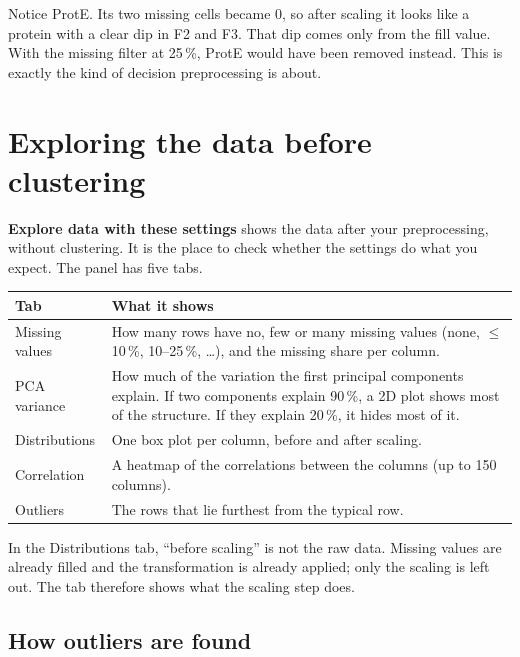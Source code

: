 \documentclass[11pt,a4paper]{article}
\newcommand{\ui}[1]{\textsf{\textbf{#1}}}   %
\begin{document}
Notice ProtE. Its two missing cells became 0, so after scaling it looks like a protein with a clear dip in F2 and
F3. That dip comes only from the fill value. With the missing filter at 25\,\%, ProtE would have been removed
instead. This is exactly the kind of decision preprocessing is about.

\section{Exploring the data before clustering}

\ui{Explore data with these settings} shows the data after your preprocessing, without clustering. It is the place
to check whether the settings do what you expect. The panel has five tabs.

\begin{center}
\begin{tabularx}{\textwidth}{lL}
\toprule
Tab & What it shows\\
\midrule
Missing values & How many rows have no, few or many missing values (none, $\le$10\,\%, 10--25\,\%, \dots), and the
  missing share per column.\\
PCA variance & How much of the variation the first principal components explain. If two components explain 90\,\%,
  a 2D plot shows most of the structure. If they explain 20\,\%, it hides most of it.\\
Distributions & One box plot per column, before and after scaling.\\
Correlation & A heatmap of the correlations between the columns (up to 150 columns).\\
Outliers & The rows that lie furthest from the typical row.\\
\bottomrule
\end{tabularx}
\end{center}

\begin{note}
In the Distributions tab, ``before scaling'' is not the raw data. Missing values are already filled and the
transformation is already applied; only the scaling is left out. The tab therefore shows what the scaling step does.
\end{note}

\subsection{How outliers are found}
\end{document}
